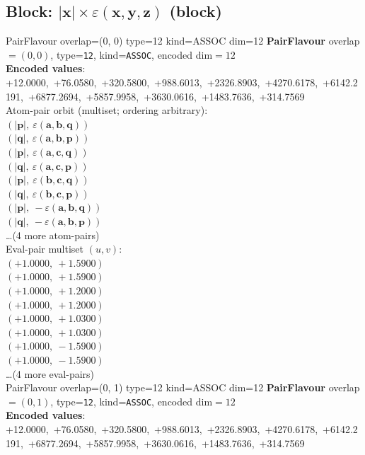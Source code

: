 \documentclass[a4paper,11pt]{article}
\newcommand{\vc}[1]{\ensuremath{\mathbf{#1}}}
\newcommand{\dnfagmiihhiejm}[1]{|\vc{#1}|}
\newcommand{\kblbmcpggoncpf}[3]{\varepsilon(\mathbf{#1},\mathbf{#2},\mathbf{#3})}
\begin{document}
\subsection{Block: $\dnfagmiihhiejm{x} \times \kblbmcpggoncpf{x}{y}{z}$  (block)}
    PairFlavour  overlap=(0, 0)  type=12  kind=ASSOC  dim=12
\textbf{PairFlavour} overlap$=(0, 0)$, type=\texttt{12}, kind=\texttt{ASSOC}, encoded dim$=12$\\
\textbf{      Encoded values}: +12.0000,\ +76.0580,\ +320.5800,\ +988.6013,\ +2326.8903,\ +4270.6178,\ +6142.2191,\ +6877.2694,\ +5857.9958,\ +3630.0616,\ +1483.7636,\ +314.7569\\
\quad Atom-pair orbit (multiset; ordering arbitrary):\\
$(\dnfagmiihhiejm{p},\ \kblbmcpggoncpf{a}{b}{q})$\\
$(\dnfagmiihhiejm{q},\ \kblbmcpggoncpf{a}{b}{p})$\\
$(\dnfagmiihhiejm{p},\ \kblbmcpggoncpf{a}{c}{q})$\\
$(\dnfagmiihhiejm{q},\ \kblbmcpggoncpf{a}{c}{p})$\\
$(\dnfagmiihhiejm{p},\ \kblbmcpggoncpf{b}{c}{q})$\\
$(\dnfagmiihhiejm{q},\ \kblbmcpggoncpf{b}{c}{p})$\\
$(\dnfagmiihhiejm{p},\ -\kblbmcpggoncpf{a}{b}{q})$\\
$(\dnfagmiihhiejm{q},\ -\kblbmcpggoncpf{a}{b}{p})$\\
\quad \ldots (4 more atom-pairs)\\
\quad Eval-pair multiset $(u, v)$:\\
$(+1.0000,\ +1.5900)$\\
$(+1.0000,\ +1.5900)$\\
$(+1.0000,\ +1.2000)$\\
$(+1.0000,\ +1.2000)$\\
$(+1.0000,\ +1.0300)$\\
$(+1.0000,\ +1.0300)$\\
$(+1.0000,\ -1.5900)$\\
$(+1.0000,\ -1.5900)$\\
\quad \ldots (4 more eval-pairs)\\
    PairFlavour  overlap=(0, 1)  type=12  kind=ASSOC  dim=12
\textbf{PairFlavour} overlap$=(0, 1)$, type=\texttt{12}, kind=\texttt{ASSOC}, encoded dim$=12$\\
\textbf{      Encoded values}: +12.0000,\ +76.0580,\ +320.5800,\ +988.6013,\ +2326.8903,\ +4270.6178,\ +6142.2191,\ +6877.2694,\ +5857.9958,\ +3630.0616,\ +1483.7636,\ +314.7569\\
\end{document}

